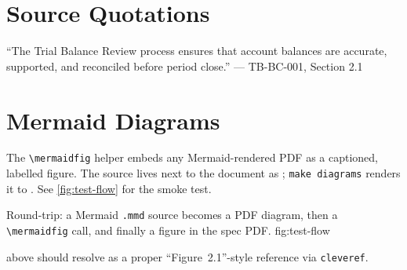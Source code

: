 \documentclass{sap-oss-apple-minimal}
\begin{document}
\section{Source Quotations}

\begin{sourcequote}
``The Trial Balance Review process ensures that account balances are accurate, supported, and reconciled before period close.'' --- TB-BC-001, Section 2.1
\end{sourcequote}

\section{Mermaid Diagrams}

The \texttt{\textbackslash mermaidfig} helper embeds any Mermaid-rendered PDF as a captioned, labelled figure. The source lives next to the document as ; \texttt{make diagrams} renders it to . See \cref{fig:test-flow} for the smoke test.

%
  {Round-trip: a Mermaid \texttt{.mmd} source becomes a PDF diagram, then a
    \texttt{\textbackslash mermaidfig} call, and finally a figure in the spec PDF.}%
  {fig:test-flow}

 above should resolve as a proper ``Figure~2.1''-style reference via \texttt{cleveref}.

\end{document}
